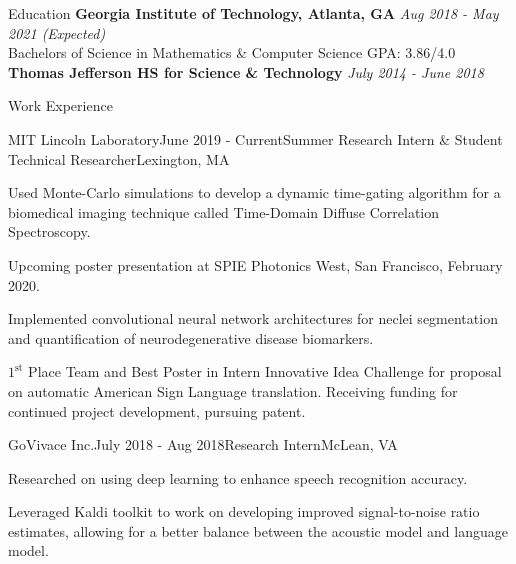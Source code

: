 \documentclass{template} %
\begin{document}

\begin{rSection}{Education}
{\bf Georgia Institute of Technology, Atlanta, GA} \hfill {\em Aug 2018 - May 2021 (Expected)}
\\ Bachelors of Science in Mathematics \& Computer Science \hfill  GPA: 3.86/4.0 \medskip
\\ {\bf Thomas Jefferson HS for Science \& Technology} \hfill {\em July 2014 - June 2018}
\end{rSection}


\begin{rSection}{Work Experience}

\begin{rSubsection}{MIT Lincoln Laboratory}{June 2019 - Current}{Summer Research Intern \& Student Technical Researcher}{Lexington, MA}
\item Used Monte-Carlo simulations to develop a  dynamic time-gating algorithm for a biomedical imaging technique called Time-Domain Diffuse Correlation Spectroscopy. 
\item Upcoming poster presentation at SPIE Photonics West, San Francisco, February 2020.
\item Implemented convolutional neural network architectures for neclei segmentation and quantification of neurodegenerative disease biomarkers.
\item$1^{\text{st}}$ Place Team and Best Poster in Intern Innovative Idea Challenge for proposal on automatic American Sign Language translation. Receiving funding for continued project development, pursuing patent.
\end{rSubsection}

\begin{rSubsection}{GoVivace Inc.}{July 2018 - Aug 2018}{Research Intern}{McLean, VA}
\item Researched on using deep learning to enhance speech recognition accuracy.
\item Leveraged Kaldi toolkit to work on developing improved signal-to-noise ratio estimates, allowing for a better balance between the acoustic model and language model.
\end{rSubsection}

\end{rSection}
\vspace{-2mm}

\end{document}
